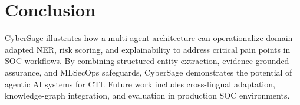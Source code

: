 \documentclass[11pt,conference]{IEEEtran}
\begin{document}
\section{Conclusion}
CyberSage illustrates how a multi-agent architecture can operationalize domain-adapted NER, risk scoring, and explainability to address critical pain points in SOC workflows.
By combining structured entity extraction, evidence-grounded assurance, and MLSecOps safeguards, CyberSage demonstrates the potential of agentic AI systems for CTI.
Future work includes cross-lingual adaptation, knowledge-graph integration, and evaluation in production SOC environments.


\nocite{*}

\end{document}
